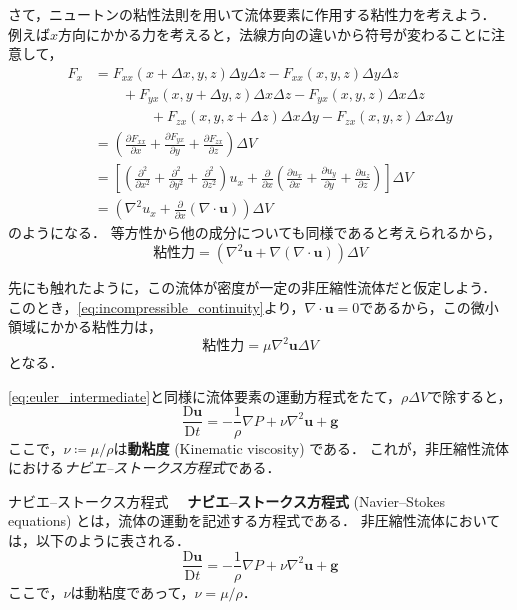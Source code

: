 \documentclass[uplatex,dvipdfmx,a4j,11pt]{jsreport}
\newcommand{\keyword}[1]{\textcolor{mainblue}{\textbf{#1}}}
\newcommand{\Diff}{\mathrm{D}} %
\numberwithin{equation}{chapter}
\begin{document}
さて，ニュートンの粘性法則を用いて流体要素に作用する粘性力を考えよう．
例えば$x$方向にかかる力を考えると，法線方向の違いから符号が変わることに注意して，
\begin{align*}
  F_x &= F_{xx}(x + \Delta x, y, z) \Delta y \Delta z - F_{xx}(x, y, z) \Delta y \Delta z \\
  &\qquad + F_{yx}(x, y + \Delta y, z) \Delta x \Delta z - F_{yx}(x, y, z) \Delta x \Delta z \\
  &\qquad\qquad + F_{zx}(x, y, z + \Delta z) \Delta x \Delta y - F_{zx}(x, y, z) \Delta x \Delta y\\
  &= \left(\frac{\partial F_{xx}}{\partial x} + \frac{\partial F_{yx}}{\partial y} + \frac{\partial F_{zx}}{\partial z}\right) \Delta V\\
  &= \left[\left(\frac{\partial^2}{\partial x^2} + \frac{\partial^2}{\partial y^2} + \frac{\partial^2}{\partial z^2}\right) u_x + \frac{\partial}{\partial x}\left(\frac{\partial u_x}{\partial x} + \frac{\partial u_y}{\partial y} + \frac{\partial u_z}{\partial z}\right)\right]\Delta V\\
  &= \left(\nabla^2 u_x + \frac{\partial}{\partial x}(\nabla \cdot \mathbf{u})\right)\Delta V
\end{align*}
のようになる．
等方性から他の成分についても同様であると考えられるから，
\begin{equation*}
  \text{粘性力} = \left(\nabla^2 \mathbf{u} + \nabla(\nabla \cdot \mathbf{u})\right)\Delta V
\end{equation*}

先にも触れたように，この流体が密度が一定の非圧縮性流体だと仮定しよう．
このとき，\cref{eq:incompressible_continuity}より，$\nabla \cdot \mathbf{u} = 0$であるから，この微小領域にかかる粘性力は，
\begin{equation*}
  \text{粘性力} = \mu \nabla^2 \mathbf{u} \Delta V
\end{equation*}
となる．

\cref{eq:euler_intermediate}と同様に流体要素の運動方程式をたて，$\rho \Delta V$で除すると，
\begin{equation}
  \frac{\Diff \mathbf{u}}{\Diff t} = -\frac{1}{\rho} \nabla P + \nu \nabla^2 \mathbf{u} + \mathbf{g}
  \label{eq:NSE_incompressible}
\end{equation}
ここで，$\nu \coloneqq \mu/\rho$は\keyword{動粘度} (Kinematic viscosity) である．
これが，非圧縮性流体における\emph{ナビエ--ストークス方程式}である．

\begin{definition}{ナビエ--ストークス方程式}{}{}
  　\keyword{ナビエ--ストークス方程式} (Navier--Stokes equations) とは，流体の運動を記述する方程式である．
  非圧縮性流体においては，以下のように表される．
  \begin{equation}
    \frac{\Diff \mathbf{u}}{\Diff t} = -\frac{1}{\rho} \nabla P + \nu \nabla^2 \mathbf{u} + \mathbf{g}
  \end{equation}
  ここで，$\nu$は動粘度であって，$\nu = \mu/\rho$．
\end{definition}
\end{document}
